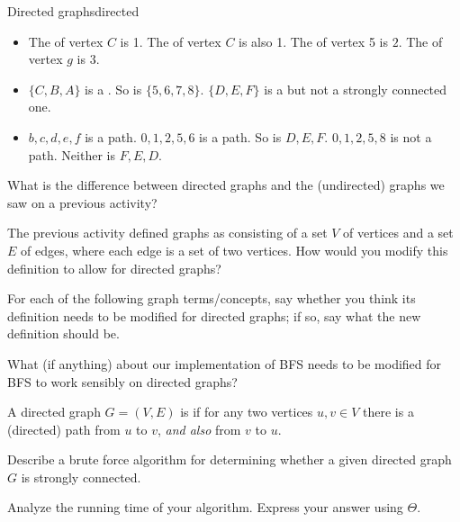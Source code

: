 \documentclass{tufte-handout}
\begin{document}
\begin{model}{Directed graphs}{directed}
  \begin{itemize}
  \item The  of vertex $C$ is 1.  The 
    of vertex $C$ is also 1.  The  of vertex 5 is $2$.
    The  of vertex $g$ is $3$.
  \item $\{C,B,A\}$ is a .  So is
    $\{5,6,7,8\}$.  $\{D,E,F\}$ is a 
    but not a strongly connected one.
  \item $b,c,d,e,f$ is a path.  $0,1,2,5,6$ is a path.  So is $D,E,F$.
    $0,1,2,5,8$ is not a path.  Neither is $F,E,D$.
  \end{itemize}
\end{model}

\begin{questions}
  \item What is the difference between directed graphs and the
    (undirected) graphs we saw on a previous activity?
  \item The previous activity defined graphs as consisting of a set
    $V$ of vertices and a set $E$ of edges, where each edge is a set
    of two vertices.  How would you modify this definition to allow
    for directed graphs?
  \item For each of the following graph terms/concepts, say whether
    you think its definition needs to be modified for directed graphs;
    if so, say what the new definition should be.
    \begin{questions}
    \item {}
    \item {}
    \item {}
    \item {}
    \end{questions}
  \item What (if anything) about our implementation of BFS needs to be
    modified for BFS to work sensibly on directed graphs?
\end{questions}

\newpage
\begin{defn}
  A directed graph $G = (V,E)$ is  if for any two
  vertices $u,v \in V$ there is a (directed) path from $u$ to $v$,
  \emph{and also} from $v$ to $u$.
\end{defn}

\begin{questions}
  \item Describe a brute force algorithm for determining whether a
    given directed graph $G$ is strongly connected.
  \item Analyze the running time of your algorithm. Express your
    answer using $\Theta$.
\end{questions}
\end{document}
